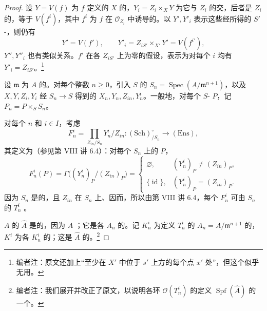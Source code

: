 \begin{proof}
设 $Y=V(f)$ 为 $f$ 定义的 $X$ 的，$Y_i=Z_i\times_X Y$ 为它与 $Z_i$ 的交，后者是 $Z_i$ 的，等于 $V(f^i)$，其中 $f^i$ 为 $f$ 在 $\mathcal O_{Z_i}$ 中诱导的。以 $Y',Y'_i$ 表示这些经所得的 $S'$-，则仍有
\[Y'=V(f'),\qquad Y'_i=Z_{iS'}\times_{X'}Y'=V(f^{i'}),\]
$Y'',Y''_i$ 也有类似关系。$f'$ 在各 $Z_{iS'}$ 上为零的假设，表示为对每个 $i$ 均有 $Y'_i=Z_{iS'}$。\footnote{编者注：原文还加上“至少在 $X'$ 中位于 $s'$ 上方的每个点 $x'$ 处”，但这个似乎无用。}

设 $\mathfrak m$ 为 $A$ 的。对每个整数 $n\geq0$，引入 $S$ 的 $S_n=\operatorname{Spec}(A/\mathfrak m^{n+1})$，以及 $X,Y,Z_i,Y_i$ 经 $S_n\to S$ 得到的 $X_n,Y_n,Z_{in},Y_n^i$。一般地，对每个 $S$- $P$，记 $P_n=P\times_S S_n$。

对每个 $n$ 和 $i\in I$，考虑
\[F_n^i=\prod_{Z_{in}/S_n}Y_n^i/Z_{in}:(\mathrm{Sch})_{/S_n}^{\circ}\longrightarrow(\mathrm{Ens}),\]
其定义为（参见第 VIII 讲 6.4）：对每个 $S_n$ 上的 $P$，
\[F_n^i(P)=\Gamma\bigl((Y_n^i)_P/(Z_{in})_P\bigr)=
\begin{cases}\varnothing,&(Y_n^i)_P\ne(Z_{in})_P,\\\{\operatorname{id}\},&(Y_n^i)_P=(Z_{in})_P.\end{cases}\]
因为 $S_n$ 是的，且 $Z_{in}$ 在 $S_n$ 上、因而，所以由第 VIII 讲 6.4，每个 $F_n^i$ 可由 $S_n$ 的 $T_n^i$ 。

$A$ 的 $\widehat A$ 是的，因为 $A$ ；它是各 $A_n$ 的。记 $K_n^i$ 为定义 $T_n^i$ 的 $A_n=A/\mathfrak m^{n+1}$ 的，$K^i$ 为各 $K_n^i$ 的；这是 $\widehat A$ 的。\footnote{编者注：我们展开并改正了原文，以说明各环 $\mathcal O(T_n^i)$ 的定义 $\operatorname{Spf}(\widehat A)$ 的一个。}


\end{proof}
